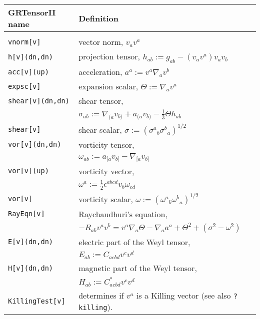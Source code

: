 \documentclass{article}
\begin{document}
{{{\renewcommand{\baselinestretch}{1.5}\normalsize
\begin{longtable}[c]{lp{}}\hline\hline
GRTensorII name & Definition \cite{ehlers:1993}\\ \hline
& \\
\texttt{vnorm[v]}	& vector norm, $v_a v^a$ \\
\texttt{h[v](dn,dn)}	& projection tensor, 
                        $h_{ab} := g_{ab} - (v_a v^a) v_a v_b$ \\
\texttt{acc[v](up)}	& acceleration, $a^a := v^a \nabla_a v^b$ \\
\texttt{expsc[v]}	& expansion scalar, $\Theta := \nabla_a v^a$ \\
\texttt{shear[v](dn,dn)}& shear tensor, \\
			& $\sigma_{ab} := \nabla_{(a} v_{b)}
			  + a_{(a} v_{b)} - \frac{1}{3} \Theta h_{ab}$\\
\texttt{shear[v]}	& shear scalar, $ \sigma 
			:= (\sigma^a{}_b \sigma^b{}_a)^{1/2}$\\
\texttt{vor[v](dn,dn)}	& vorticity tensor, \\
			& $\omega_{ab} := a_{[a} v_{b]}- \nabla_{[a} v_{b]}$\\
\texttt{vor[v](up)}	& vorticity vector,\\ & $\omega^a
			:= \frac{1}{2}\epsilon^{abcd} v_b \omega_{cd}$\\
\texttt{vor[v]}		& vorticity scalar, $\omega 
			:= (\omega^a{}_b \omega^b{}_a)^{1/2}$\\
\texttt{RayEqn[v]}	& Raychaudhuri's equation,\\
			& $ -R_{ab} v^a v^b = v^a \nabla_a\Theta
			- \nabla_a a^a + \Theta^2 + (\sigma^2 - \omega^2)$ \\
\texttt{E[v](dn,dn)}	& electric part of the Weyl tensor, \\
			& $E_{ab} := C_{acbd} v^c v^d$ \\
\texttt{H[v](dn,dn)}	& magnetic part of the  Weyl tensor, \\
			& $H_{ab} := C^*_{acbd} v^c v^d$ \\
\texttt{KillingTest[v]}	& determines if $v^a$ is a Killing 
			  vector (see also \texttt{?killing}).\\
\hline
\end{longtable}
\renewcommand{\baselinestretch}{1}\normalsize
%
\vfill


\pagebreak
}}}
\end{document}
